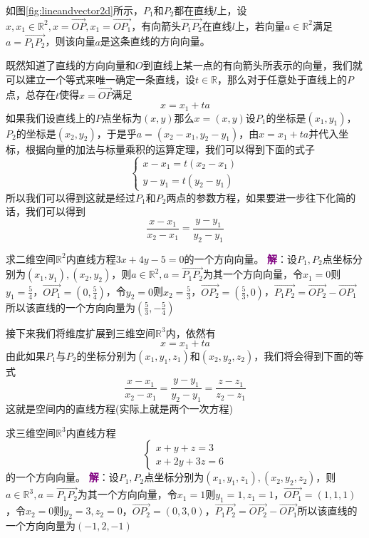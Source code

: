 如图\ref{fig:lineandvector2d}所示，$P_1$和$P_2$都在直线$l$上，设$x,x_1\in \mathbb{R}^2,x=\overrightarrow{OP},x_1=\overrightarrow{OP_1}$，有向箭头$\overrightarrow{P_1P_2}$在直线$l$上，若向量$a\in \mathbb{R}^2$满足$a=\overrightarrow{P_1P_2}$，则该向量$a$是这条直线的方向向量。

既然知道了直线的方向向量和$O$到直线上某一点的有向箭头所表示的向量，我们就可以建立一个等式来唯一确定一条直线，设$t\in \mathbb{R}$，那么对于任意处于直线上的$P$点，总存在$t$使得$x=\overrightarrow{OP}$满足$$x=x_1+ta$$如果我们设直线上的$P$点坐标为$(x,y)$那么$x=(x,y)$设$P_1$的坐标是$(x_1,y_1)$，$P_2$的坐标是$(x_2,y_2)$，于是乎$a=(x_2-x_1,y_2-y_1)$，由$x=x_1+ta$并代入坐标，根据向量的加法与标量乘积的运算定理，我们可以得到下面的式子$$\left\{\begin{matrix} 
	x-x_1=t(x_2-x_1) \\  
	y-y_1=t(y_2-y_1)
\end{matrix}\right. $$所以我们可以得到这就是经过$P_1$和$P_2$两点的参数方程，如果要进一步往下化简的话，我们可以得到$$\frac{x-x_1}{x_2-x_1}=\frac{y-y_1}{y_2-y_1}$$

\begin{example}
	求二维空间$\mathbb{R}^2$内直线方程$3x+4y-5=0$的一个方向向量。
	\tcblower
	\textcolor{purple}{\textbf{解}}：设$P_1,P_2$点坐标分别为$(x_1,y_1),(x_2,y_2)$，则$a\in \mathbb{R}^2,a=\overrightarrow{P_1P_2}$为其一个方向向量，令$x_1=0$则$\displaystyle y_1=\frac{5}{4}$，$\displaystyle \overrightarrow{OP_1}=\left( 0,\frac{5}{4} \right)$，令$y_2=0$则$\displaystyle x_2=\frac{5}{3}$，$\displaystyle \overrightarrow{OP_2}=\left(\frac{5}{3},0\right)$，$\overrightarrow{P_1P_2}=\overrightarrow{OP_2}-\overrightarrow{OP_1}$所以该直线的一个方向向量为$\displaystyle \left( \frac{5}{3},-\frac{5}{4} \right) $
\end{example}

接下来我们将维度扩展到三维空间$\mathbb{R}^3$内，依然有$$x=x_1+ta$$由此如果$P_1$与$P_2$的坐标分别为$(x_1,y_1,z_1)$和$(x_2,y_2,z_2)$，我们将会得到下面的等式$$\frac{x-x_1}{x_2-x_1}=\frac{y-y_1}{y_2-y_1}=\frac{z-z_1}{z_2-z_1}$$这就是空间内的直线方程(实际上就是两个一次方程)

\begin{example}
	求三维空间$\mathbb{R}^3$内直线方程$$\left\{\begin{matrix} 
		x+y+z=3 \\  
		x+2y+3z=6
	\end{matrix}\right. $$的一个方向向量。
	\tcblower
	\textcolor{purple}{\textbf{解}}：设$P_1,P_2$点坐标分别为$(x_1,y_1,z_1),(x_2,y_2,z_2)$，则$a\in \mathbb{R}^3,a=\overrightarrow{P_1P_2}$为其一个方向向量，令$x_1=1$则$\displaystyle y_1=1,z_1=1$，$\displaystyle \overrightarrow{OP_1}=\left( 1,1,1 \right)$，令$x_2=0$则$\displaystyle y_2=3,z_2=0$，$\displaystyle \overrightarrow{OP_2}=\left(0,3,0\right)$，$\overrightarrow{P_1P_2}=\overrightarrow{OP_2}-\overrightarrow{OP_1}$所以该直线的一个方向向量为$\displaystyle \left( -1,2,-1 \right) $
\end{example}

